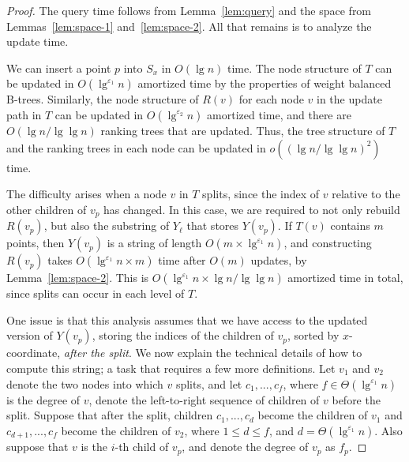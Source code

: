 \documentclass{llncs}
\begin{document}
\begin{proof}
The query time follows from Lemma~\ref{lem:query} and the space from
Lemmas~\ref{lem:space-1} and~\ref{lem:space-2}. All that remains is to
analyze the update time.

We can insert a point $p$ into $S_x$ in $O(\lg n)$ time.  The node
structure of $T$ can be updated in $O(\lg^{\varepsilon_1}n)$ amortized
time by the properties of weight balanced B-trees.  Similarly, the
node structure of $R(v)$ for each node $v$ in the update path in $T$
can be updated in $O(\lg^{\varepsilon_2}n)$ amortized time, and there
are $O(\lg n / \lg \lg n)$ ranking trees that are updated.  Thus, the
tree structure of $T$ and the ranking trees in each node can be
updated in $o((\lg n / \lg \lg n)^2)$ time.

The difficulty arises when a node $v$ in $T$ splits, since the index
of $v$ relative to the other children of $v_p$ has changed.  In this
case, we are required to not only rebuild $R(v_p)$, but also the
substring of $Y_\ell$ that stores $Y(v_p)$.  If $T(v)$ contains $m$
points, then $Y(v_p)$ is a string of length $O(m \times
\lg^{\varepsilon_1}n)$, and constructing $R(v_p)$ takes
$O(\lg^{\varepsilon_1}n \times m)$ time after $O(m)$ updates, by
Lemma~\ref{lem:space-2}.  This is $O(\lg^{\varepsilon_1}n \times \lg n
/ \lg \lg n)$ amortized time in total, since splits can occur in each
level of $T$.

One issue is that this analysis assumes that we have access to the
updated version of $Y(v_p)$, storing the indices of the children of
$v_p$, sorted by $x$-coordinate, \emph{after the split}.  We now
explain the technical details of how to compute this string; a task
that requires a few more definitions. Let $v_1$ and $v_2$ denote the
two nodes into which $v$ splits, and let $c_1, ..., c_f$, where $f \in
\Theta(\lg^{\varepsilon_1}n)$ is the degree of $v$, denote the
left-to-right sequence of children of $v$ before the split.  Suppose
that after the split, children $c_1, ..., c_d$ become the children of
$v_1$ and $c_{d+1}, ..., c_f$ become the children of $v_2$, where $1
\le d \le f$, and $d = \Theta(\lg^{\varepsilon_1}n)$.  Also suppose
that $v$ is the $i$-th child of $v_p$, and denote the degree of $v_p$
as $f_p$.


\end{proof}
\end{document}
